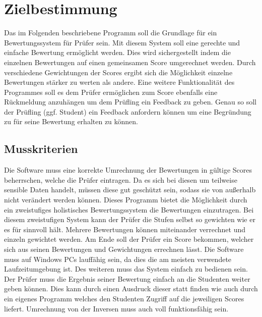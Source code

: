 \documentclass[a4paper,listof=leveldown,listof=numbered]{scrreprt}
\begin{document}
	
	
	\tableofcontents
	
\chapter{Zielbestimmung}
	Das im Folgenden beschriebene Programm soll die Grundlage für ein Bewertungssystem für Prüfer sein. Mit diesem System soll eine gerechte und einfache Bewertung ermöglicht werden. Dies wird sichergestellt indem die einzelnen Bewertungen auf einen gemeinsamen Score umgerechnet werden. Durch verschiedene Gewichtungen der Scores ergibt sich die Möglichkeit einzelne Bewertungen stärker zu werten als andere. Eine weitere Funktionalität des Programmes soll es dem Prüfer ermöglichen zum Score ebenfalls eine Rückmeldung anzuhängen um dem Prüfling ein Feedback zu geben. Genau so soll der Prüfling (ggf. Student) ein Feedback anfordern können um eine Begründung zu für seine Bewertung erhalten zu können.
	
	\section{Musskriterien}
	Die Software muss eine korrekte Umrechnung der Bewertungen in gültige Scores beherrschen, welche die Prüfer eintragen. Da es sich bei diesen um teilweise sensible Daten handelt, müssen diese gut geschützt sein, sodass sie von außerhalb nicht verändert werden können. Dieses Programm bietet die Möglichkeit durch ein zweistufiges holistisches Bewertungssystem die Bewertungen einzutragen. Bei diesem zweistufigen System kann der Prüfer die Stufen selbst so gewichten wie er es für sinnvoll hält. Mehrere Bewertungen können miteinander verrechnet und einzeln gewichtet werden. Am Ende soll der Prüfer ein Score bekommen, welcher sich aus seinen Bewertungen und Gewichtungen errechnen lässt. Die Software muss auf Windows PCs lauffähig sein, da dies die am meisten verwendete Laufzeitumgebung ist. Des weiteren muss das System einfach zu bedienen sein. Der Prüfer muss die Ergebnis seiner Bewertung einfach an die Studenten weiter geben können. Dies kann durch einen Ausdruck dieser statt finden wie auch durch ein eigenes Programm welches den Studenten Zugriff auf die jeweiligen Scores liefert. Umrechnung von der Inversen muss auch voll funktionsfähig sein. 
	
\end{document}
